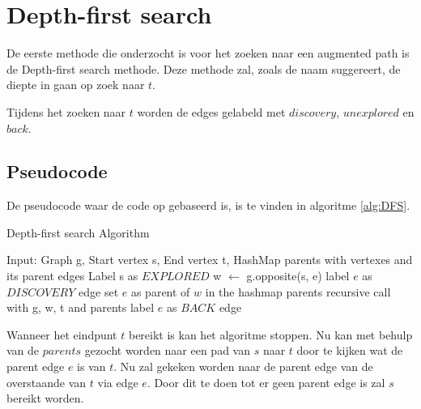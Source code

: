 \chapter{Depth-first search}
\label{chap:depthfirst}

De eerste methode die onderzocht is voor het zoeken naar een augmented path is de Depth-first search methode. Deze methode zal, zoals de naam suggereert, de diepte in gaan op zoek naar $t$. 


Tijdens het zoeken naar $t$ worden de edges gelabeld met $discovery$, $unexplored$ en $back$. 

\section{Pseudocode}
De pseudocode waar de code op gebaseerd is, is te vinden in algoritme \ref{alg:DFS}.

\begin{algorithm}[h]
\caption{Depth-first search Algorithm}
\label{alg:DFS}
\begin{algorithmic}
\REQUIRE Input: Graph g, Start vertex s, End vertex t, HashMap parents with vertexes and its parent edges
\STATE Label s as $EXPLORED$
\STATE w $\gets$ g.opposite(s, e)
\STATE label $e$ as $DISCOVERY$ edge
\STATE set $e$ as parent of $w$ in the hashmap parents
\STATE recursive call with g, w, t and parents
\ELSE
\STATE label $e$ as $BACK$ edge
\ENDIF
\ENDIF
\ENDFOR
\end{algorithmic}
\end{algorithm}

Wanneer het eindpunt $t$ bereikt is kan het algoritme stoppen. Nu kan met behulp van de $parents$ gezocht worden naar een pad van $s$ naar $t$ door te kijken wat de parent edge $e$ is van $t$. Nu zal gekeken worden naar de parent edge van de overstaande van $t$ via edge $e$. Door dit te doen tot er geen parent edge is zal $s$ bereikt worden.